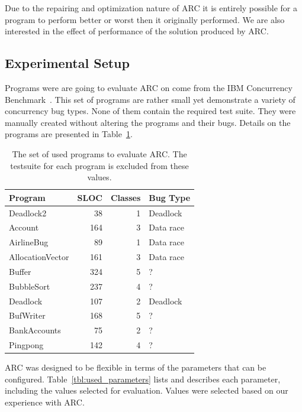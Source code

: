 \documentclass[10pt, conference, compsocconf]{IEEEtran}
\begin{document}
Due to the repairing and optimization nature of ARC it is entirely possible for
a program to perform better or worst then it originally performed. We are
also interested in the effect of performance of the solution produced by ARC.

\subsection{Experimental Setup}
\label{sec:experimental_setup}

Programs were are going to evaluate ARC on come from the IBM
Concurrency Benchmark~\cite{EHSU06}. This set of programs are rather small yet
demonstrate a variety of concurrency bug types. None of them contain the required
test suite.  They were manually created without altering the programs and their
bugs. Details on the programs are presented in Table~\ref{tbl:used_programs}.

\begin{table}[!h]
\begin{center}
\begin{tabular}{|l|r|r|l|}
\hline
\textbf{Program} &
\textbf{SLOC} &
\textbf{Classes} &
\textbf{Bug Type}
\\\hline
Deadlock2 & 38 & 1 & Deadlock
\\\hline
Account & 164 & 3 & Data race
\\\hline
AirlineBug & 89 & 1 & Data race
\\\hline
AllocationVector & 161 & 3 & Data race
\\\hline
Buffer & 324 & 5 & ?
\\\hline
BubbleSort & 237 & 4 & ?
\\\hline
Deadlock & 107 & 2 & Deadlock
\\\hline
BufWriter& 168 & 5 & ?
\\\hline
BankAccounts & 75 & 2 & ?
\\\hline
Pingpong & 142 & 4 & ?
\\\hline
\end{tabular}
\caption{The set of used programs to evaluate ARC. The testsuite for each
program is excluded from these values.}
\label{tbl:used_programs}
\end{center}
\end{table}

ARC was designed to be flexible in terms of the parameters that can be
configured. Table~\ref{tbl:used_parameters} lists and describes each parameter,
including the values selected for evaluation. Values were selected based on
our experience with ARC.
\end{document}
